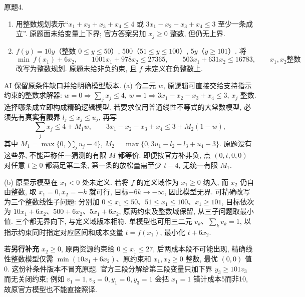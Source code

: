\begin{exercise}\label{ass:15053-practice-q4}
原题4.
\begin{enumerate}[label=(\alph*)]
\item 用整数规划表示“$x_1+x_2+x_3+x_4\le4$ 或 $3x_1-x_2-x_3+x_4\le3$ 至少一条成立”. 原题面未给变量上下界; 官方答案另加 $x_j\ge0$ 整数, 但仍无上界.
\item $f(y)=10y$（整数 $0\le y\le50$）, $500$（$51\le y\le100$）, $5y$（$y\ge101$）. 将
\[
\min\ f(x_1)+6x_2,\qquad1001x_1+978x_2\le27365,\qquad503x_1+631x_2\le16783,\qquad x_1,x_2\text{整数}
\]
改写为整数规划. 原题未给非负约束, 且 $f$ 未定义在负整数上.
\end{enumerate}
\end{exercise}
\begin{solution}
AI 保留原条件缺口并给明确模型版本. (a) 令二元 $w$, 原逻辑可直接交给支持指示约束的整数求解器:
$w=0\Rightarrow\sum_jx_j\le4$, $w=1\Rightarrow3x_1-x_2-x_3+x_4\le3$, $x_j$ 整数. 选择哪条成立即构成精确逻辑模型. 若要求仅用普通线性不等式的大常数模型, 必须先有\textbf{真实有限界} $l_j\le x_j\le u_j$, 再写
\[
\sum_jx_j\le4+M_1w,\qquad3x_1-x_2-x_3+x_4\le3+M_2(1-w),
\]
其中 $M_1=\max\{0,\sum_ju_j-4\}$, $M_2=\max\{0,3u_1-l_2-l_3+u_4-3\}$. 原题没有这些界, 不能声称任一猜测的有限 $M$ 都等价. 即便按官方补非负, 点 $(0,t,0,0)$ 对任意 $t\ge0$ 都满足第二条, 第一条的放松量需至少 $t-4$, 无统一有限 $M_1$.

(b) 原显示模型在 $x_1<0$ 处未定义. 若将 $f$ 的定义域作为 $x_1\ge0$ 纳入, 而 $x_2$ 仍自由整数, 取 $x_1=0,x_2=-k$ 就可行, 目标$-6k\to-\infty$, 因此模型无界. 可精确改写为三个整数线性子问题: 分别加 $0\le x_1\le50$、$51\le x_1\le100$、$x_1\ge101$, 目标依次为 $10x_1+6x_2$、$500+6x_2$、$5x_1+6x_2$, 原两约束及整数域保留, 从三子问题取最小值. 三个都无界向下, 与定义域版本相符. 单模型也可用三二元 $v_k$、$\sum_kv_k=1$, 以指示约束同时指定对应区间和成本变量 $t=f(x_1)$, 最小化 $t+6x_2$.

若\textbf{另行补充} $x_2\ge0$, 原两资源约束给 $0\le x_1\le27$, 后两成本段不可能出现, 精确线性整数模型仅需 $\min(10x_1+6x_2)$、原约束和 $x_1,x_2\ge0$ 整数, 最优 $(0,0)$ 值0. 这份补条件版本不冒充原题. 官方三段分解给第三段变量只加下界 $y_3\ge101v_3$ 而无关闭约束; 例如 $v_1=1,v_3=0,y_1=0,y_3=1$ 会把 $x_1=1$ 错计成本5而非10, 故原官方模型也不能直接照译.
\end{solution}

